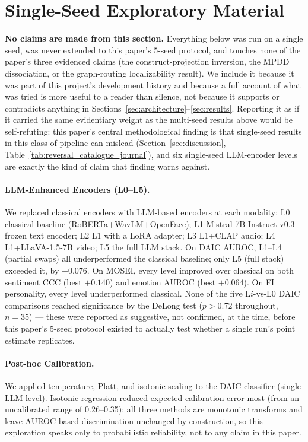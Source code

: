 \documentclass[twocolumn]{article}
\begin{document}
\section{Single-Seed Exploratory Material}
\label{sec:exploratory}

\textbf{No claims are made from this section.} Everything below was run on a single seed, was never extended to this paper's 5-seed protocol, and touches none of the paper's three evidenced claims (the construct-projection inversion, the MPDD dissociation, or the graph-routing localizability result). We include it because it was part of this project's development history and because a full account of what was tried is more useful to a reader than silence, not because it supports or contradicts anything in Sections~\ref{sec:architecture}--\ref{sec:results}. Reporting it as if it carried the same evidentiary weight as the multi-seed results above would be self-refuting: this paper's central methodological finding is that single-seed results in this class of pipeline can mislead (Section~\ref{sec:discussion}, Table~\ref{tab:reversal_catalogue_journal}), and six single-seed LLM-encoder levels are exactly the kind of claim that finding warns against.

\paragraph{LLM-Enhanced Encoders (L0--L5).} We replaced classical encoders with LLM-based encoders at each modality: L0 classical baseline (RoBERTa+WavLM+OpenFace); L1 Mistral-7B-Instruct-v0.3 frozen text encoder; L2 L1 with a LoRA adapter; L3 L1+CLAP audio; L4 L1+LLaVA-1.5-7B video; L5 the full LLM stack. On DAIC AUROC, L1--L4 (partial swaps) all underperformed the classical baseline; only L5 (full stack) exceeded it, by $+0.076$. On MOSEI, every level improved over classical on both sentiment CCC (best $+0.140$) and emotion AUROC (best $+0.064$). On FI personality, every level underperformed classical. None of the five L$i$-vs-L0 DAIC comparisons reached significance by the DeLong test ($p>0.72$ throughout, $n{=}35$) — these were reported as suggestive, not confirmed, at the time, before this paper's 5-seed protocol existed to actually test whether a single run's point estimate replicates.

\paragraph{Post-hoc Calibration.} We applied temperature, Platt, and isotonic scaling to the DAIC classifier (single LLM level). Isotonic regression reduced expected calibration error most (from an uncalibrated range of 0.26--0.35); all three methods are monotonic transforms and leave AUROC-based discrimination unchanged by construction, so this exploration speaks only to probabilistic reliability, not to any claim in this paper.
\end{document}
